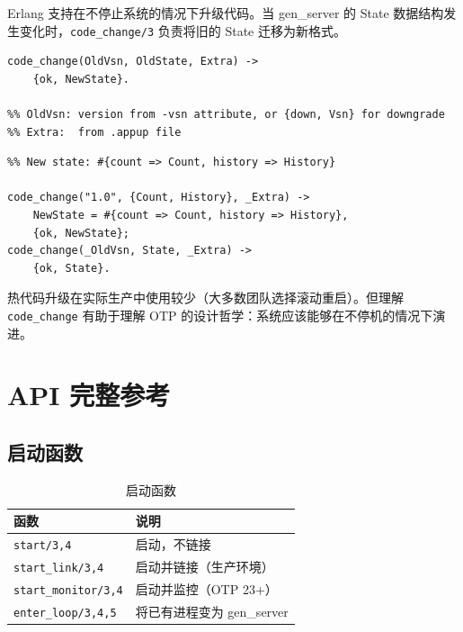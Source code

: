 \documentclass[a4paper,11pt]{article}
\begin{document}
Erlang 支持在不停止系统的情况下升级代码。当 gen\_server 的 State 数据结构发生变化时，\texttt{code\_change/3} 负责将旧的 State 迁移为新格式。

\begin{lstlisting}[style=erlangstyle, caption={code\_change/3 回调}]
code_change(OldVsn, OldState, Extra) ->
    {ok, NewState}.

%% OldVsn: version from -vsn attribute, or {down, Vsn} for downgrade
%% Extra:  from .appup file
\end{lstlisting}

\begin{lstlisting}[style=erlangstyle, caption={code\_change 示例：State 从 tuple 迁移到 map}]
%% Old state: {Count, History}
%% New state: #{count => Count, history => History}

code_change("1.0", {Count, History}, _Extra) ->
    NewState = #{count => Count, history => History},
    {ok, NewState};
code_change(_OldVsn, State, _Extra) ->
    {ok, State}.
\end{lstlisting}

\begin{notebox}[实际使用]
热代码升级在实际生产中使用较少（大多数团队选择滚动重启）。但理解 \texttt{code\_change} 有助于理解 OTP 的设计哲学：系统应该能够在不停机的情况下演进。
\end{notebox}


\section{API 完整参考}

\subsection{启动函数}

\begin{table}[H]
\centering
\small
\begin{tabular}{@{}lp{7cm}@{}}
\toprule
\textbf{函数} & \textbf{说明} \\
\midrule
\texttt{start/3,4} & 启动，不链接 \\
\texttt{start\_link/3,4} & 启动并链接（生产环境） \\
\texttt{start\_monitor/3,4} & 启动并监控（OTP 23+） \\
\texttt{enter\_loop/3,4,5} & 将已有进程变为 gen\_server \\
\bottomrule
\end{tabular}
\caption{启动函数}
\end{table}
\end{document}
